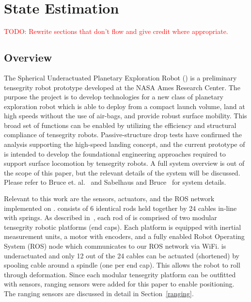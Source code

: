 \chapter{State Estimation}
\label{state_estimation}

\textcolor{red}{TODO: Rewrite sections that don't flow and give credit where appropriate.}

\section{\SB{} Overview}
\label{overview}

The Spherical Underactuated Planetary Exploration Robot (\SB{}) is a preliminary tensegrity robot prototype developed at the NASA Ames Research Center. 
The purpose the \SB{} project is to develop technologies for a new class of planetary exploration robot which is able to 
deploy from a compact launch volume, land at high speeds without the use of air-bags, and provide robust surface mobility.  This broad set of functions can be enabled by utilizing the efficiency and structural compliance of tensegrity robots.  Passive-structure drop tests have confirmed the analysis supporting the high-speed landing concept, and the current prototype of \SB{} is intended to develop the foundational engineering approaches required to support surface locomotion by tensegrity robots. 
A full system overview is out of the scope of this paper, but the relevant details of the system will be discussed.
Please refer to Bruce et. al.~\cite{bruce2014design} and Sabelhaus and Bruce~\cite{sabelhaus2015system} for system details.

Relevant to this work are the sensors, actuators, and the ROS network implemented on \SB{}.
\SB{} consists of 6 identical rods held together by 24 cables in-line with springs.
As described in~\cite{bruce2014design}, each rod of \SB{} is comprised of two modular tensegrity robotic platforms (end caps).
Each platform is equipped with inertial measurement units, a motor with encoders, and a fully enabled Robot Operating System (ROS) node which communicates to our ROS network via WiFi.
\SB{} is underactuated and only 12 out of the 24 cables can be actuated (shortened) by spooling cable around a spindle (one per end cap).
This allows the robot to roll through deformation.
Since each modular tensegrity platform can be outfitted with sensors, ranging sensors were added for this paper to enable positioning.
The ranging sensors are discussed in detail in Section~\ref{ranging}.

